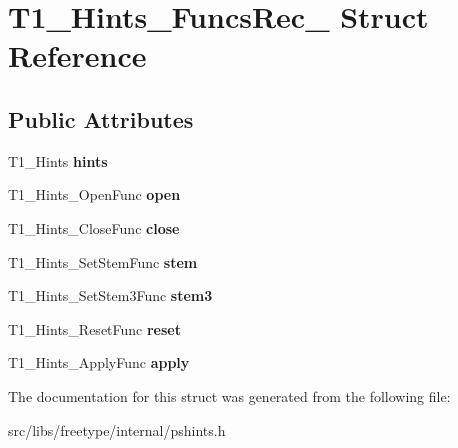 \hypertarget{struct_t1___hints___funcs_rec__}{
\section{T1\_\-Hints\_\-FuncsRec\_\- Struct Reference}
\label{struct_t1___hints___funcs_rec__}
}
\subsection*{Public Attributes}
\begin{DoxyCompactItemize}
\item 
\hypertarget{struct_t1___hints___funcs_rec___a6a58f489e362b746703b4caae91349ef}{
T1\_\-Hints {\bfseries hints}}
\label{struct_t1___hints___funcs_rec___a6a58f489e362b746703b4caae91349ef}

\item 
\hypertarget{struct_t1___hints___funcs_rec___a41ca09a042c8e92f64822f19486a622a}{
T1\_\-Hints\_\-OpenFunc {\bfseries open}}
\label{struct_t1___hints___funcs_rec___a41ca09a042c8e92f64822f19486a622a}

\item 
\hypertarget{struct_t1___hints___funcs_rec___aa6d879215bff42f4b3851a9151c78505}{
T1\_\-Hints\_\-CloseFunc {\bfseries close}}
\label{struct_t1___hints___funcs_rec___aa6d879215bff42f4b3851a9151c78505}

\item 
\hypertarget{struct_t1___hints___funcs_rec___abdbf955a1fc9b19799ed8ea8137c9381}{
T1\_\-Hints\_\-SetStemFunc {\bfseries stem}}
\label{struct_t1___hints___funcs_rec___abdbf955a1fc9b19799ed8ea8137c9381}

\item 
\hypertarget{struct_t1___hints___funcs_rec___acc1edae831d279929f93c8eb1872daa3}{
T1\_\-Hints\_\-SetStem3Func {\bfseries stem3}}
\label{struct_t1___hints___funcs_rec___acc1edae831d279929f93c8eb1872daa3}

\item 
\hypertarget{struct_t1___hints___funcs_rec___a5646878cdabd593389e28cffd8b077cb}{
T1\_\-Hints\_\-ResetFunc {\bfseries reset}}
\label{struct_t1___hints___funcs_rec___a5646878cdabd593389e28cffd8b077cb}

\item 
\hypertarget{struct_t1___hints___funcs_rec___a3fb5f01de31da9efb2ae8f5251b4d506}{
T1\_\-Hints\_\-ApplyFunc {\bfseries apply}}
\label{struct_t1___hints___funcs_rec___a3fb5f01de31da9efb2ae8f5251b4d506}

\end{DoxyCompactItemize}


The documentation for this struct was generated from the following file:\begin{DoxyCompactItemize}
\item 
src/libs/freetype/internal/pshints.h\end{DoxyCompactItemize}
